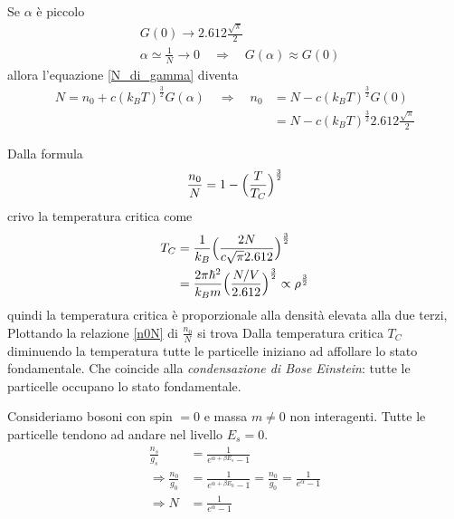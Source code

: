 Se $\alpha$ è piccolo
\begin{equation}
\begin{split}
& G(0) \to 2.612 \frac{\sqrt{\pi}}{2} \\
& \alpha \simeq \frac{1}{N} \to 0 \quad\Rightarrow\quad G(\alpha) \approx G(0)
\end{split}
\end{equation}
allora l'equazione \ref{N_di_gamma} diventa
\begin{equation}
\begin{split}
N = n_0 + c (k_B T)^{ \frac{3}{2} } G(\alpha)
\quad\Rightarrow\quad 
n_0 & = N -  c (k_B T)^{ \frac{3}{2} } G(0) \\
& = N -  c (k_B T)^{ \frac{3}{2} } 2.612 \frac{\sqrt{\pi}}{2}
\end{split}
\end{equation}

Dalla formula 
\begin{equation}
\frac{n_0}{N} = 1 - \Bigl(  \frac{T}{T_C}  \Bigr)^{ \frac{3}{2} } 
\label{n0N}
\end{equation}
crivo la temperatura critica come
\begin{equation}
\begin{split}
T_C & = \frac{1}{k_B} \Bigl(  \frac{2N}{c \sqrt{\pi} 2.612}  \Bigr)^{ \frac{3}{2} } \\
&= \frac{2\pi \hbar^2}{k_B m} \Bigl(  \frac{N/V}{2.612}  \Bigr)^{ \frac{3}{2} } \propto \rho^{ \frac{3}{2} }
\end{split}
\end{equation}
quindi la temperatura critica è proporzionale alla densità elevata alla due terzi,
Plottando la relazione \ref{n0N} di $\frac{n_0}{N}$ si trova 
Dalla temperatura critica $T_C$ diminuendo la temperatura tutte le particelle iniziano ad affollare lo stato fondamentale.
Che coincide alla \emph{condensazione di Bose Einstein}: tutte le particelle occupano lo stato fondamentale.








\newpage
Consideriamo bosoni con spin $= 0$ e massa $m \not = 0$ non interagenti.
Tutte le particelle tendono ad andare nel livello $E_s=0$.
\begin{equation}
\begin{split}
\frac{ n_s}{g_s } & = \frac{ 1}{e^{ \alpha + \beta E_s } - 1 } \\
\Rightarrow \frac{ n_0}{g_0 } & = \frac{ 1}{e^{ \alpha + \beta E_0 } - 1 } = \frac{ n_0}{g_0 } = \frac{ 1}{e^{ \alpha } - 1 } \\
\Rightarrow N & = \frac{ 1}{e^{ \alpha } - 1 }
\end{split}
\end{equation}

